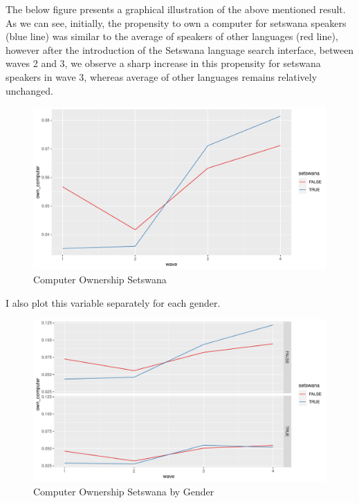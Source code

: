 \documentclass[a4paper,british]{article}\usepackage[]{graphicx}\usepackage[]{xcolor}
\makeatletter
\def\maxwidth{ %
  \ifdim\Gin@nat@width>\linewidth
    \linewidth
  \else
    \Gin@nat@width
  \fi
}
\newenvironment{knitrout}{}{} %
\makeatother
\begin{document}
The below figure presents a graphical illustration of the above mentioned
result. As we can see, initially, the propensity to own a computer
for setswana speakers (blue line) was similar to the average of speakers
of other languages (red line), however after the introduction of the
Setswana language search interface, between waves 2 and 3, we observe
a sharp increase in this propensity for setswana speakers in wave
3, whereas average of other languages remains relatively unchanged.

\begin{figure}[H]
\caption{Computer Ownership Setswana}

\begin{knitrout}
\color{fgcolor}
\includegraphics[width=\maxwidth]{../misc/latex-gg2_5-1} 
\end{knitrout}
\end{figure}

I also plot this variable separately for each gender.

\begin{figure}[H]
\caption{Computer Ownership Setswana by Gender}

\begin{knitrout}
\color{fgcolor}
\includegraphics[width=\maxwidth]{../misc/latex-gender_gg2_5-1} 
\end{knitrout}
\end{figure}
\end{document}
